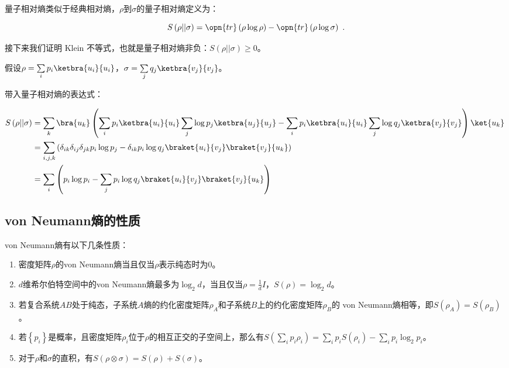 量子相对熵类似于经典相对熵，$\rho$到$\sigma$的量子相对熵定义为：

\begin{equation}
S\left(\rho || \sigma\right) = \opn{tr}\left(\rho \log \rho\right) - \opn{tr}\left(\rho \log \sigma\right)~.
\end{equation}

接下来我们证明 Klein 不等式，也就是量子相对熵非负：$S\left(\rho || \sigma\right) \geqslant 0$。

假设$\rho = \sum\limits_ip_i\ketbra{u_i}{u_i}$，$\sigma = \sum\limits_jq_j\ketbra{v_j}{v_j}$。

带入量子相对熵的表达式：

\begin{equation}
\begin{aligned}
S\left(\rho || \sigma\right) &= \sum_k \bra{u_k}\left( \sum_ip_i\ketbra{u_i}{u_i}\sum_j\log p_j\ketbra{u_j}{u_j} - \sum_ip_i\ketbra{u_i}{u_i}\sum_j\log q_j\ketbra{v_j}{v_j} \right)\ket{u_k} \\
&= \sum_{i,j,k}\left(\delta_{ik}\delta_{ij}\delta_{jk}p_i\log p_j - \delta_{ik}p_i \log q_j \braket{u_i}{v_j}\braket{v_j}{u_k}\right) \\
&= \sum_i\left( p_i\log p_i - \sum_jp_i\log q_j \braket{u_i}{v_j}\braket{v_j}{u_k} \right)
\end{aligned}~
\end{equation}


\subsection{von Neumann熵的性质}

von Neumann熵有以下几条性质：

\begin{enumerate}
\item 密度矩阵$\rho$的von Neumann熵当且仅当$\rho$表示纯态时为0。
\item $d$维希尔伯特空间中的von Neumann熵最多为$\log_2 d$，当且仅当$\rho = \frac{1}{d}I$，$S(\rho) = \log_2 d$。
\item 若复合系统$AB$处于纯态，子系统$A$熵的约化密度矩阵$\rho_A$和子系统$B$上的约化密度矩阵$\rho_B$的 von Neumann熵相等，即$S\left(\rho_A\right) = S\left(\rho_B\right)$。
\item 若$\left\{p_i\right\}$是概率，且密度矩阵$\rho_i$位于$\rho$的相互正交的子空间上，那么有$S\left(\sum\limits_ip_i\rho_i\right) = \sum\limits_ip_iS\left(\rho_i\right) - \sum\limits_ip_i\log_2p_i$。
\item 对于$\rho$和$\sigma$的直积，有$S\left(\rho\otimes\sigma\right) = S\left(\rho\right) + S\left(\sigma\right)$。
\end{enumerate}

